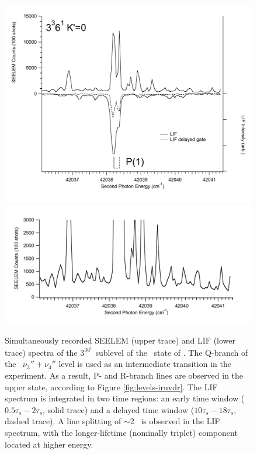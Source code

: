 \begin{figure}
  \caption{Simultaneously recorded SEELEM (upper trace) and LIF (lower
    trace) spectra of the $3^36^1$  sublevel of the \astate\
    state of .  The Q-branch of the \xstate\ $\nu_3'' +
    \nu_4''$ level is used as an intermediate transition in the
    experiment.  As a result, P- and R-branch lines are observed in
    the upper state, according to Figure \ref{fig:levels-iruvdr}.  The
    LIF spectrum is integrated in two time regions: an early time
    window ($0.5\tau_s-2\tau_s$, solid trace) and a delayed time
    window ($10\tau_s-18\tau_s$, dashed trace).  A line splitting of
    $\sim 2$ \rcm\ is observed in the LIF spectrum, with the
    longer-lifetime (nominally triplet) component located at higher
    energy.}
  \label{fig:3361-p1}
  \centering
  \includegraphics[width=5.8in]{spectrum-3361-p1-primed}
  \includegraphics[width=6in]{spectrum-3361-p1-zoom}
\end{figure}

